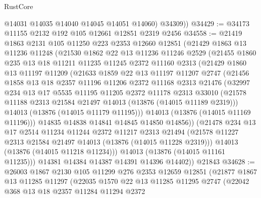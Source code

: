 \begin{lexlean}{RustCore}
\begin{coremodule}
          @14031
          @14035
          @14040
          @14045
          @14051
          @14060)
        @34309))
@34429 := @34173 @11155 @2132 @192 @105 @12661 @12851 @2319 @2456
@34558 := @21419
    @1863
    @2131
    @105
    @11250
    @223
    @2353
    @12660
    @12851
    (@21429
      @1863
      @13
      @11236
      @11248
      (@21530
        @1862
        @22
        @13
        @11236
        @11246
        @2529
        (@21455
          @1860
          @235
          @13
          @18
          @11211
          @11235
          @11245
          @2372
          @11160
          @2313
          (@21429
            @1860
            @13
            @11197
            @11209
            (@21633
              @1859
              @22
              @13
              @11197
              @11207
              @2747
              (@21456
                @1858
                @13
                @18
                @2357
                @11196
                @11206
                @2372
                @11168
                @2313
                @21476
                (@32997
                  @234
                  @13
                  @17
                  @5535
                  @11195
                  @11205
                  @2372
                  @11178
                  @2313
                  @33010
                  (@21578 @11188 @2313 @21584 @21497 @14013 (@13876 (@14015 @11189 @2319)))
                  @14013
                  (@13876 (@14015 @11179 @11195)))
                @14013
                (@13876 (@14015 @11169 @11196)))
              @14835
              @14838
              @14841
              @14845
              @14850
              @14856))
          (@21478
            @234
            @13
            @17
            @2514
            @11234
            @11244
            @2372
            @11217
            @2313
            @21494
            (@21578 @11227 @2313 @21584 @21497 @14013 (@13876 (@14015 @11228 @2319)))
            @14013
            (@13876 (@14015 @11218 @11234)))
          @14013
          (@13876 (@14015 @11161 @11235)))
        @14381
        @14384
        @14387
        @14391
        @14396
        @14402))
    @21843
@34628 := @26003
    @1867
    @2130
    @105
    @11299
    @276
    @2353
    @12659
    @12851
    (@21877
      @1867
      @13
      @11285
      @11297
      (@22035
        @1570
        @22
        @13
        @11285
        @11295
        @2747
        (@22042
          @368
          @13
          @18
          @2357
          @11284
          @11294
          @2372

\end{coremodule}
\end{lexlean}
